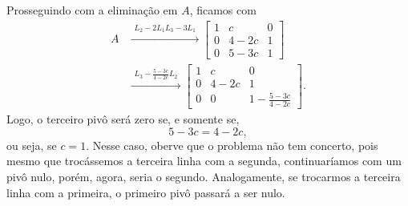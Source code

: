 \documentclass[leqno]{article}
\numberwithin{equation}{section}
\begin{document}
\begin{enumerate}
\begin{enumerate}
                        \begin{sol} 
                            Prosseguindo com a eliminação em \( A \), ficamos com
                            \begin{align*}
                                A
                                &\xrightarrow{
                                    \begin{array}{l}
                                        L_{ 2 } - 2 L_{ 1 }
                                        L_{ 3 } - 3 L_{ 1 }
                                    \end{array}
                                }
                                \begin{bmatrix}
                                    1 & c & 0  \\
                                    0 & 4 - 2 c & 1  \\
                                    0 & 5 - 3 c & 1 
                                \end{bmatrix} \\
                                &\xrightarrow{
                                    \begin{array}{l}
                                        L_{ 3 } - \frac{ 5 - 3c }{ 4 - 2 c } L_{ 2 }
                                    \end{array}
                                }
                                \begin{bmatrix}
                                    1 & c & 0  \\
                                    0 & 4 - 2 c & 1  \\
                                    0 & 0       & 1 - \frac{ 5 - 3c }{ 4 - 2c } 
                                \end{bmatrix}
                            .\end{align*}
                            Logo, o terceiro pivô será zero se, e somente se,
                            \begin{equation*}
                                5 - 3c = 4 - 2c
                            ,\end{equation*}
                            ou seja, se \( c = 1 \).
                            Nesse caso, oberve que o problema não tem concerto, pois mesmo que trocássemos a terceira linha com a segunda, continuaríamos com um pivô nulo, porém, agora, seria o segundo.
                            Analogamente, se trocarmos a terceira linha com a primeira, o primeiro pivô passará a ser nulo.
                        \end{sol} 


\end{enumerate}
\end{enumerate}
\end{document}
